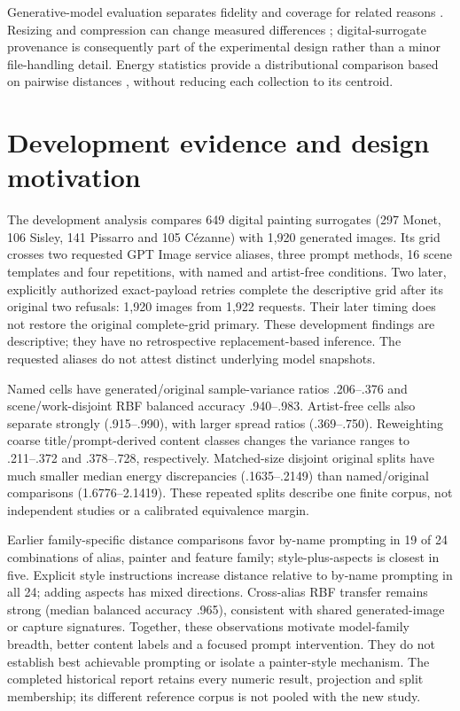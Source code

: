 \documentclass[11pt]{article}
\begin{document}
Generative-model evaluation separates fidelity and coverage for related reasons
\citep{naeem2020}. Resizing and compression can change measured differences
\citep{parmar2022}; digital-surrogate provenance is consequently part of the
experimental design rather than a minor file-handling detail. Energy statistics
provide a distributional comparison based on pairwise distances
\citep{szekely2013}, without reducing each collection to its centroid.

\section{Development evidence and design motivation}
The development analysis compares 649 digital painting surrogates (297 Monet,
106 Sisley, 141 Pissarro and 105 Cézanne) with 1,920 generated images. Its grid
crosses two requested GPT Image service aliases, three prompt methods, 16 scene
templates and four repetitions, with named and artist-free conditions. Two later,
explicitly authorized exact-payload retries complete the descriptive grid after
its original two refusals: 1,920 images from 1,922 requests. Their later timing
does not restore the original complete-grid primary. These development findings
are descriptive; they have no retrospective replacement-based inference.
The requested aliases do not attest distinct underlying model snapshots.

Named cells have generated/original sample-variance ratios .206--.376 and
scene/work-disjoint RBF balanced accuracy .940--.983. Artist-free cells also
separate strongly (.915--.990), with larger spread ratios (.369--.750).
Reweighting coarse title/prompt-derived content classes changes the variance
ranges to .211--.372 and .378--.728, respectively. Matched-size disjoint original
splits have much smaller median energy discrepancies (.1635--.2149) than
named/original comparisons (1.6776--2.1419). These repeated splits describe one
finite corpus, not independent studies or a calibrated equivalence margin.

Earlier family-specific distance comparisons favor by-name prompting in 19 of
24 combinations of alias, painter and feature family; style-plus-aspects is closest
in five. Explicit
style instructions increase distance relative to by-name prompting in all 24;
adding aspects has mixed directions. Cross-alias RBF transfer remains strong
(median balanced accuracy .965), consistent with shared generated-image or
capture signatures. Together, these observations motivate model-family breadth,
better content labels and a focused prompt intervention. They do not establish
best achievable prompting or isolate a painter-style mechanism. The completed
historical report retains every numeric result, projection and split membership;
its different reference corpus is not pooled with the new study.
\end{document}
